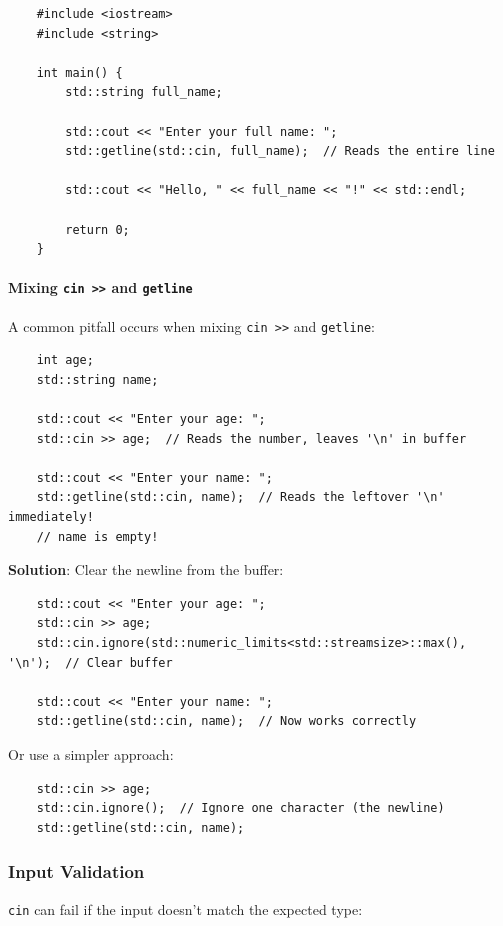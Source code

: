 \begin{lstlisting}
	#include <iostream>
	#include <string>
	
	int main() {
		std::string full_name;
		
		std::cout << "Enter your full name: ";
		std::getline(std::cin, full_name);  // Reads the entire line
		
		std::cout << "Hello, " << full_name << "!" << std::endl;
		
		return 0;
	}
\end{lstlisting}

\paragraph{Mixing \texttt{cin >>} and \texttt{getline}}

A common pitfall occurs when mixing \texttt{cin >>} and \texttt{getline}:

\begin{lstlisting}
	int age;
	std::string name;
	
	std::cout << "Enter your age: ";
	std::cin >> age;  // Reads the number, leaves '\n' in buffer
	
	std::cout << "Enter your name: ";
	std::getline(std::cin, name);  // Reads the leftover '\n' immediately!
	// name is empty!
\end{lstlisting}

\textbf{Solution}: Clear the newline from the buffer:

\begin{lstlisting}
	std::cout << "Enter your age: ";
	std::cin >> age;
	std::cin.ignore(std::numeric_limits<std::streamsize>::max(), '\n');  // Clear buffer
	
	std::cout << "Enter your name: ";
	std::getline(std::cin, name);  // Now works correctly
\end{lstlisting}

Or use a simpler approach:

\begin{lstlisting}
	std::cin >> age;
	std::cin.ignore();  // Ignore one character (the newline)
	std::getline(std::cin, name);
\end{lstlisting}

\subsubsection{Input Validation}

\texttt{cin} can fail if the input doesn't match the expected type:

